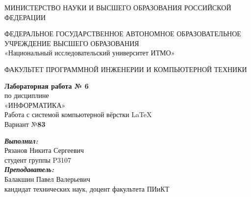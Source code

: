 
% 
    \thispagestyle{fancy} %
    \fancyhead{} %
    \fancyfoot{} %
    
    \begin{center}
        МИНИСТЕРСТВО НАУКИ И ВЫСШЕГО ОБРАЗОВАНИЯ РОССИЙСКОЙ ФЕДЕРАЦИИ

        \vspace{2em}

        ФЕДЕРАЛЬНОЕ ГОСУДАРСТВЕННОЕ АВТОНОМНОЕ ОБРАЗОВАТЕЛЬНОЕ УЧРЕЖДЕНИЕ ВЫСШЕГО ОБРАЗОВАНИЯ\\
        \large{«Национальный исследовательский университет ИТМО»}

        \vspace{2em}
        \Large{ФАКУЛЬТЕТ ПРОГРАММНОЙ ИНЖЕНЕРИИ И КОМПЬЮТЕРНОЙ ТЕХНИКИ}

        \vfill
        
        \textbf{\Large{Лабораторная работа № 6}}\\
        \vspace{1em}
        \Large{по дисциплине\\\vspace{1em}«ИНФОРМАТИКА»}\\
        \vspace{1em}
        \Large{Работа с системой компьютерной вёрстки \LaTeX}\\
        \vspace{1em}
        Вариант №\textbf{83}

        \vfill
    \end{center}

    \begin{flushright}
        \vfill
        \large{
            \textbf{\textit{Выполнил:}}\\
            Рязанов Никита Сергеевич\\
            студент группы P3107\\
            \vspace{1em}
            \textbf{\textit{Преподаватель:}}\\
            Балакшин Павел Валерьевич\\
            кандидат технических наук, доцент факультета ПИиКТ
        }
        \vfill
    \end{flushright}
    \clearpage
% 